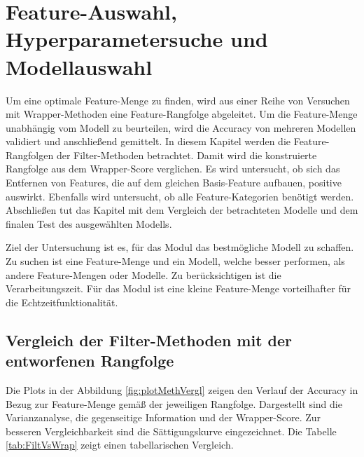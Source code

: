 \section{Feature-Auswahl, Hyperparametersuche und Modellauswahl} \label{sec:Ergeb FeatSel,Hyp,ModSel}
Um eine optimale Feature-Menge zu finden, wird aus einer Reihe von Versuchen mit Wrapper-Methoden eine Feature-Rangfolge abgeleitet. Um die Feature-Menge unabhängig vom Modell zu beurteilen, wird die Accuracy von mehreren Modellen validiert und anschließend gemittelt. In diesem Kapitel werden die Feature-Rangfolgen der Filter-Methoden betrachtet. Damit wird die konstruierte Rangfolge aus dem Wrapper-Score verglichen. Es wird untersucht, ob sich das Entfernen von Features, die auf dem gleichen Basis-Feature aufbauen, positive auswirkt. Ebenfalls wird untersucht, ob alle Feature-Kategorien benötigt werden. Abschließen tut das Kapitel mit dem Vergleich der betrachteten Modelle und dem finalen Test des ausgewählten Modells.\par

Ziel der Untersuchung ist es, für das Modul das bestmögliche Modell zu schaffen. Zu suchen ist eine Feature-Menge und ein Modell, welche besser performen, als andere Feature-Mengen oder Modelle. Zu berücksichtigen ist die Verarbeitungszeit. Für das Modul ist eine kleine Feature-Menge vorteilhafter für die Echtzeitfunktionalität. \par


\subsection{Vergleich der Filter-Methoden mit der entworfenen Rangfolge}
Die Plots in der Abbildung \ref{fig:plotMethVergl} zeigen den Verlauf der Accuracy in Bezug zur Feature-Menge gemäß der jeweiligen Rangfolge. Dargestellt sind die Varianzanalyse, die gegenseitige Information und der Wrapper-Score. Zur besseren Vergleichbarkeit sind die Sättigungskurve eingezeichnet. Die Tabelle \ref{tab:FiltVsWrap} zeigt einen tabellarischen Vergleich.

